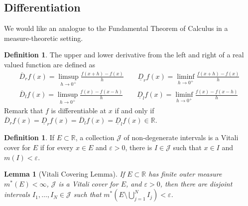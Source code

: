 \documentclass[11pt]{amsart}
\newtheorem{lemma}[theorem]{Lemma}
\theoremstyle{definition}
\newtheorem{definition}[theorem]{Definition}
\numberwithin{equation}{section}
\begin{document}
\subsection{Differentiation}
We would like an analogue to the Fundamental Theorem of Calculus in a measure-theoretic setting.
\begin{definition}
    The upper and lower derivative from the left and right of a real valued function are defined as 
    \begin{align*}
        \overline D_rf(x)=\limsup_{h\to 0^+}\frac{f(x+h)-f(x)}{h}\qquad \underline D_rf(x)=\liminf_{h\to0^+}\frac{f(x+h)-f(x)}{h}\\
        \overline D_lf(x)=\limsup_{h\to 0^+}\frac{f(x)-f(x-h)}{h}\qquad\underline D_lf(x)=\liminf_{h\to0^+}\frac{f(x)-f(x-h)}{h}
    \end{align*}
    Remark that $f$ is differentiable at $x$ if and only if $\overline D_rf(x)=\underline D_rf(x)=\overline D_lf(x)=\underline D_lf(x)\in\mathbb R$.
\end{definition}
\begin{definition}
    If $E\subset\mathbb R$, a collection $\mathcal J$ of non-degenerate intervals is a Vitali cover for $E$ if for every $x\in E$ and $\varepsilon>0$, there is $I\in \mathcal J$ such that $x\in I$ and $m(I)<\varepsilon$.
\end{definition}
\begin{lemma}[Vitali Covering Lemma]
    If $E\subset\mathbb R$ has finite outer measure $m^*(E)<\infty$, $\mathcal J$ is a Vitali cover for $E$, and $\varepsilon>0$, then there are disjoint intervals $I_1,\ldots, I_N\in\mathcal J$ such that $m^*(E\setminus \bigcup_{j=1}^NI_j)<\varepsilon$.
\end{lemma}
\end{document}
